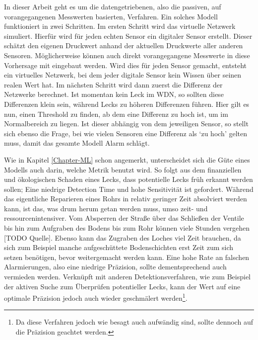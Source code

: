 In dieser Arbeit geht es um die datengetriebenen, also die passiven, auf vorangegangenen Messwerten
 basierten, Verfahren. Ein solches Modell funktioniert in zwei Schritten. Im ersten Schritt wird das
 virtuelle Netzwerk simuliert. Hierfür wird für jeden echten Sensor ein digitaler Sensor erstellt. Dieser
 schätzt den eigenen Druckwert anhand der aktuellen Druckwerte aller anderen Sensoren. Möglicherweise können
 auch direkt vorangegangene Messwerte in diese Vorhersage mit eingebaut werden. Wird dies für jeden Sensor
 gemacht, entsteht ein virtuelles Netzwerk, bei dem jeder digitale Sensor kein Wissen über seinen realen Wert
 hat. Im nächsten Schritt wird dann zuerst die Differenz der Netzwerke berechnet. Ist momentan kein Leck im
 WDN, so sollten diese Differenzen klein sein, während Lecks zu höheren Differenzen führen. Hier gilt es nun,
 einen Threshold zu finden, ab dem eine Differenz zu hoch ist, um im Normalbereich zu liegen. Ist dieser
 abhängig von dem jeweiligen Sensor, so stellt sich ebenso die Frage, bei wie vielen Sensoren eine Differenz
 als ‘zu hoch’ gelten muss, damit das gesamte Modell Alarm schlägt.

Wie in Kapitel \ref{Chapter-ML} schon angemerkt, unterscheidet sich die Güte eines Modells auch darin, welche Metrik
 benutzt wird. So folgt aus dem finanziellen und ökologischen Schaden eines Lecks, dass potentielle Lecks
 früh erkannt werden sollen; Eine niedrige Detection Time und hohe Sensitivität ist gefordert.
 Während das eigentliche Reparieren eines Rohrs in relativ geringer Zeit absolviert werden kann, ist das, was
 drum herum getan werden muss, umso zeit- und ressourcenintensiver. Vom Absperren der Straße über das Schließen
 der Ventile bis hin zum Aufgraben des Bodens bis zum Rohr können viele Stunden vergehen [TODO Quelle]. Ebenso kann
 das Zugraben des Loches viel Zeit brauchen, da sich zum Beispiel manche aufgeschüttete Bodenschichten erst Zeit
 zum sich setzen benötigen, bevor weitergemacht werden kann. Eine hohe Rate an falschen Alarmierungen, also eine
 niedrige Präzision, sollte dementsprechend auch vermieden werden. Verknüpft mit anderen Detektionsverfahren,
 wie zum Beispiel der aktiven Suche zum Überprüfen potentieller Lecks, kann der Wert auf eine optimale Präzision
 jedoch auch wieder geschmälert werden\footnote{Da diese Verfahren jedoch wie besagt auch aufwändig sind, sollte
 dennoch auf die Präzision geachtet werden.}.
